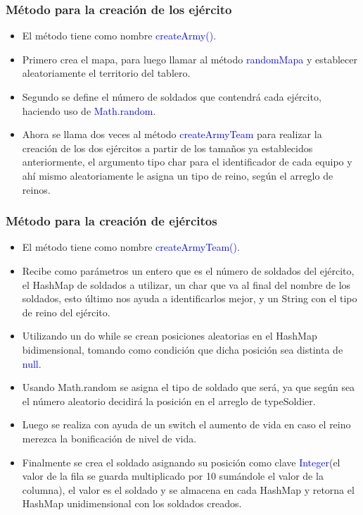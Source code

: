 \documentclass{article}
\begin{document}
\subsubsection{Método para la creación de los ejército}
\begin{itemize}
    \item El método tiene como nombre \textcolor{blue}{createArmy()}.
    \item Primero crea el mapa, para luego llamar al método \textcolor{blue}{randomMapa} y establecer aleatoriamente el territorio del tablero.
    \item Segundo se define el número de soldados que contendrá cada ejército, haciendo uso de \textcolor{blue}{Math.random}.
    \item Ahora se llama dos veces al método \textcolor{blue}{createArmyTeam} para realizar la creación de los dos ejércitos a partir de los tamaños ya establecidos anteriormente, el argumento tipo char para el identificador de cada equipo y ahí mismo aleatoriamente le asigna un tipo de reino, según el arreglo de reinos.
\end{itemize}



\subsubsection{Método para la creación de ejércitos}
\begin{itemize}
    \item El método tiene como nombre \textcolor{blue}{createArmyTeam()}.
    \item Recibe como parámetros un entero que es el número de soldados del ejército, el HashMap de soldados a utilizar, un char que va al final del nombre de los soldados, esto último nos ayuda a identificarlos mejor, y un String con el tipo de reino del ejército.
    \item Utilizando un do while se crean posiciones aleatorias en el HashMap bidimensional, tomando como condición que dicha posición sea distinta de \textcolor{blue}{null}.
    \item Usando Math.random se asigna el tipo de soldado que será, ya que según sea el número aleatorio decidirá la posición en el arreglo de typeSoldier.
    \item Luego se realiza con ayuda de un switch el aumento de vida en caso el reino merezca la bonificación de nivel de vida.
    \item Finalmente se crea el soldado asignando su posición como clave \textcolor{blue}{Integer}(el valor de la fila se guarda multiplicado por 10 sumándole el valor de la columna), el valor es el soldado y se almacena en cada HashMap y retorna el HashMap unidimensional con los soldados creados.
\end{itemize}

\end{document}
